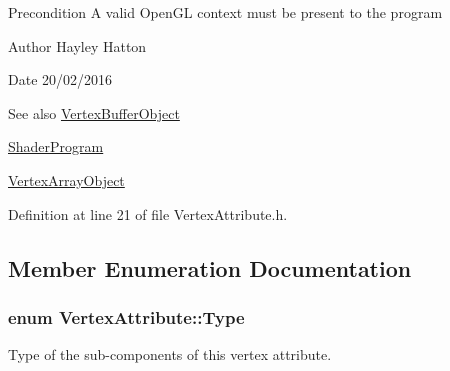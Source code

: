 \begin{DoxyPrecond}{Precondition}
A valid Open\+GL context must be present to the program 
\end{DoxyPrecond}
\begin{DoxyAuthor}{Author}
Hayley Hatton 
\end{DoxyAuthor}
\begin{DoxyDate}{Date}
20/02/2016 
\end{DoxyDate}
\begin{DoxySeeAlso}{See also}
\hyperlink{class_vertex_buffer_object}{Vertex\+Buffer\+Object} 

\hyperlink{class_shader_program}{Shader\+Program} 

\hyperlink{class_vertex_array_object}{Vertex\+Array\+Object} 
\end{DoxySeeAlso}


Definition at line 21 of file Vertex\+Attribute.\+h.



\subsection{Member Enumeration Documentation}
\subsubsection[{\texorpdfstring{Type}{Type}}]{\setlength{\rightskip}{0pt plus 5cm}enum {\bf Vertex\+Attribute\+::\+Type}\hspace{0.3cm}{\ttfamily [strong]}}\hypertarget{class_vertex_attribute_abe7f703a33ec0d67ecd975c08dc33f9b}{}\label{class_vertex_attribute_abe7f703a33ec0d67ecd975c08dc33f9b}


Type of the sub-\/components of this vertex attribute. 

